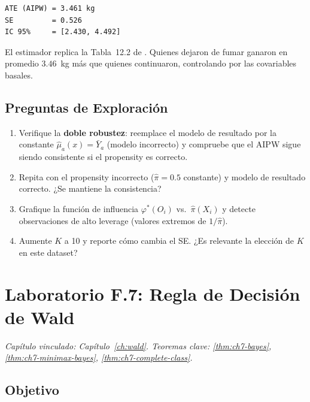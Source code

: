 \begin{verbatim}
ATE (AIPW) = 3.461 kg
SE         = 0.526
IC 95%     = [2.430, 4.492]
\end{verbatim}

El estimador replica la Tabla~12.2 de \citealt{hernan2020causal}.
Quienes dejaron de fumar ganaron en promedio $3.46$~kg más que quienes
continuaron, controlando por las covariables basales.

\subsection*{Preguntas de Exploración}

\begin{enumerate}
    \item Verifique la \textbf{doble robustez}: reemplace el modelo de
          resultado por la constante $\hat\mu_a(x) = \bar Y_a$
          (modelo incorrecto) y compruebe que el AIPW sigue siendo
          consistente si el propensity es correcto.
    \item Repita con el propensity incorrecto ($\hat\pi = 0.5$ constante)
          y modelo de resultado correcto. ¿Se mantiene la consistencia?
    \item Grafique la función de influencia $\varphi^*(O_i)$ vs.\
          $\hat\pi(X_i)$ y detecte observaciones de alto leverage
          (valores extremos de $1/\hat\pi$).
    \item Aumente $K$ a 10 y reporte cómo cambia el SE. ¿Es relevante
          la elección de $K$ en este dataset?
\end{enumerate}

\section{Laboratorio F.7: Regla de Decisión de Wald}
\label{lab:F7}
\textit{Capítulo vinculado: Capítulo~\ref{ch:wald}.
Teoremas clave: \ref{thm:ch7-bayes}, \ref{thm:ch7-minimax-bayes},
\ref{thm:ch7-complete-class}.}

\bigskip

\subsection*{Objetivo}

